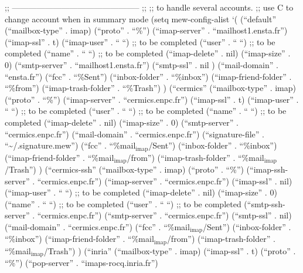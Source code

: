 \documentclass[11pt]{article}
\begin{document}
;; ----------------------------------------------- ;;
;; to handle several accounts.
;; use C to change account when in summary mode
(setq mew-config-alist
      `(
        (``default''
         (``mailbox-type'' . imap)
         (``proto'' . ``\%'')
         (``imap-server'' . ``mailhost1.ensta.fr'')
         (``imap-ssl'' . t)
         (``imap-user'' . `` ``) ;; to be completed
         (``user'' . `` ``) ;; to be completed
         (``name'' . `` ``) ;; to be completed
         (``imap-delete'' . nil)
         (``imap-size'' . 0)
         (``smtp-server'' . ``mailhost1.ensta.fr'')
         (``smtp-ssl'' . nil )
         (``mail-domain'' . ``ensta.fr'')
         (``fcc'' . ``\%Sent'')
         (``inbox-folder'' . ``\%inbox'')
         (``imap-friend-folder'' . ``\%from'')
         (``imap-trash-folder'' . ``\%Trash'')
         )
        (``cermics''
         (``mailbox-type'' . imap)
         (``proto'' . ``\%'')
         (``imap-server'' . ``cermics.enpc.fr'')
         (``imap-ssl'' . t)
         (``imap-user'' . `` ``) ;; to be completed
         (``user'' . `` ``) ;; to be completed
         (``name'' . `` ``) ;; to be completed
         (``imap-delete'' . nil)
         (``imap-size'' . 0)
         (``smtp-server'' . ``cermics.enpc.fr'')
         (``mail-domain'' . ``cermics.enpc.fr'')
         (``signature-file'' . ``\~{}/.signature.mew'')
         (``fcc'' . ``\%mail$_{\mathrm{imap}}$/Sent'')
         (``inbox-folder'' . ``\%inbox'')
         (``imap-friend-folder'' . ``\%mail$_{\mathrm{imap}}$/from'')
         (``imap-trash-folder'' . ``\%mail$_{\mathrm{imap}}$/Trash'')
         )
        (``cermics-ssh''
         (``mailbox-type'' . imap)
         (``proto'' . ``\%'')
         (``imap-ssh-server'' . ``cermics.enpc.fr'')
         (``imap-server'' . ``cermics.enpc.fr'')
         (``imap-ssl'' . nil)
         (``imap-user'' . `` ``) ;; to be completed
         (``imap-delete'' . nil)
         (``imap-size'' . 0)
         (``name'' . `` ``) ;; to be completed
         (``user'' . `` ``) ;; to be completed
         (``smtp-ssh-server'' . ``cermics.enpc.fr'')
         (``smtp-server'' . ``cermics.enpc.fr'')
         (``smtp-ssl'' . nil)
         (``mail-domain'' . ``cermics.enpc.fr'')
         (``fcc'' . ``\%mail$_{\mathrm{imap}}$/Sent'')
         (``inbox-folder'' . ``\%inbox'')
         (``imap-friend-folder'' . ``\%mail$_{\mathrm{imap}}$/from'')
         (``imap-trash-folder'' . ``\%mail$_{\mathrm{imap}}$/Trash'')
         )
        (``inria''
         (``mailbox-type'' . imap)
         (``imap-ssl'' . t)
         (``proto'' . ``\%'')
         (``pop-server'' . ``imaps-rocq.inria.fr'')
\end{document}
